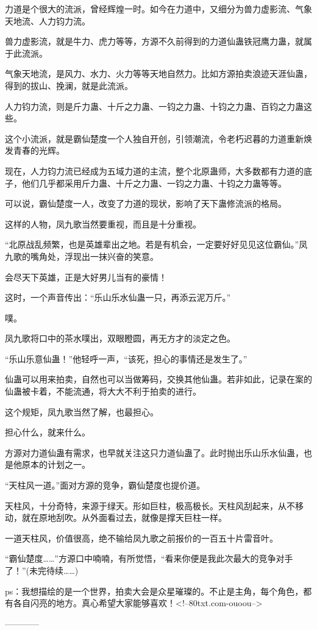 \begin{this_body}
力道是个很大的流派，曾经辉煌一时。如今在力道中，又细分为兽力虚影流、气象天地流、人力钧力流。

兽力虚影流，就是牛力、虎力等等，方源不久前得到的力道仙蛊铁冠鹰力蛊，就属于此流派。

气象天地流，是风力、水力、火力等等天地自然力。比如方源拍卖浪迹天涯仙蛊，得到的拔山、挽澜，就是此流派。

人力钧力流，则是斤力蛊、十斤之力蛊、一钧之力蛊、十钧之力蛊、百钧之力蛊这些。

这个小流派，就是霸仙楚度一个人独自开创，引领潮流，令老朽迟暮的力道重新焕发青春的光辉。

现在，人力钧力流已经成为五域力道的主流，整个北原蛊师，大多数都有力道的底子，他们几乎都采用斤力蛊、十斤之力蛊、一钧之力蛊、十钧之力蛊等等。

可以说，霸仙楚度一人，改变了力道的现状，影响了天下蛊修流派的格局。

这样的人物，凤九歌当然要重视，而且是十分重视。

“北原战乱频繁，也是英雄辈出之地。若是有机会，一定要好好见见这位霸仙。”凤九歌的嘴角处，浮现出一抹兴奋的笑意。

会尽天下英雄，正是大好男儿当有的豪情！

这时，一个声音传出：“乐山乐水仙蛊一只，再添云泥万斤。”

噗。

凤九歌将口中的茶水噗出，双眼瞪圆，再无方才的淡定之色。

“乐山乐意仙蛊！”他轻呼一声，“该死，担心的事情还是发生了。”

仙蛊可以用来拍卖，自然也可以当做筹码，交换其他仙蛊。若非如此，记录在案的仙蛊被卡着，不能流通，将大大不利于拍卖的进行。

这个规矩，凤九歌当然了解，也最担心。

担心什么，就来什么。

方源对力道仙蛊有需求，也早就关注这只力道仙蛊了。此时抛出乐山乐水仙蛊，也是他原本的计划之一。

“天柱风一道。”面对方源的竞争，霸仙楚度也提价道。

天柱风，十分奇特，来源于绿天。形如巨柱，极高极长。天柱风刮起来，从不移动，就在原地刮吹。从外面看过去，就像是撑天巨柱一样。

一道天柱风，价值很高，绝不输给凤九歌之前报价的一百五十片雷音叶。

“霸仙楚度……”方源口中喃喃，有所觉悟，“看来你便是我此次最大的竞争对手了！”(未完待续……)

ps：我想描绘的是一个世界，拍卖大会是众星璀璨的。不止是主角，每个角色，都有各自闪亮的地方。真心希望大家能够喜欢！<!--80txt.com-ouoou-->

------------

\end{this_body}

